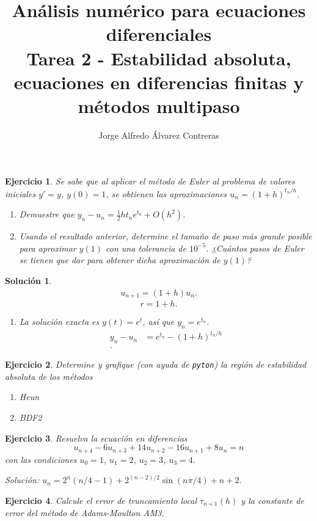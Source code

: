 \documentclass[11pt]{article}
\title{Análisis numérico para ecuaciones diferenciales \\
Tarea 2 - Estabilidad absoluta, ecuaciones en diferencias finitas y
métodos multipaso}
\author{Jorge Alfredo Álvarez Contreras}
\newtheorem{exercise}{Ejercicio}
\newtheorem*{sol}{Solución}
\begin{document}
\maketitle

\begin{exercise}
   Se sabe que al aplicar el método de Euler al problema de valores
   iniciales $y'=y$, $y(0)=1$, se obtienen las aproximaciones
   $u_n=(1+h)^{t_n / h}$.
   \begin{enumerate}
     \item
       Demuestre que $y_n-u_n = \frac{1}{2}ht_ne^{t_n}+O(h^{2})$.
     \item
       Usando el resultado anterior, determine el tamaño de paso más
       grande posible para aproximar $y(1)$ con una tolerancia de
       $10^{-5}$. ¿Cuántos pasos de Euler se tienen que dar para
       obtener dicha aproximación de $y(1)$?
   \end{enumerate}
\end{exercise}
\begin{sol}
  \begin{align}
    u_{n+1}
    = (1 + h)u_n
  .\end{align}
  \begin{equation}
    r = 1 + h
  .\end{equation}
  
  
  \begin{enumerate}
    \item
      La solución exacta es $y(t)=e^t$, así que $y_n=e^{t_n}$.
      \begin{align}
        y_n - u_n
        &= e^{t_n} - (1+h)^{t_n/h} \\
      .\end{align}
      
  \end{enumerate}
\end{sol}

\begin{exercise}
  Determine y grafique (con ayuda de \texttt{pyton}) la región de
  estabilidad absoluta de los métodos
  \begin{enumerate}
    \item
      Heun
    \item
      BDF2
  \end{enumerate}
\end{exercise}

\begin{exercise}
  Resuelva la ecuación en diferencias
  \begin{equation}
    u_{n+4} - 6u_{n+3} + 14u_{n+2} - 16 u_{n+1} + 8u_{n} = n
  \end{equation}
  con las condiciones $u_0=1$, $u_1=2$, $u_2=3$, $u_3=4$.

  \emph{Solución: $u_n=2^n(n / 4 -1) + 2^{(n-2) / 2}\sin(n\pi /
  4)+n+2$}.
\end{exercise}

\begin{exercise}
  Calcule el error de truncamiento local $\tau_{n+1}(h)$ y la
  constante de error del método de Adams-Moulton AM3.
\end{exercise}
\end{document}
